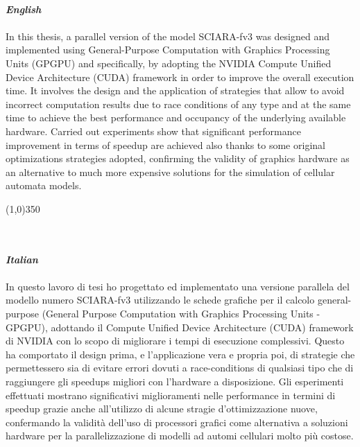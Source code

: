 \hfill \\
\textit{\textbf{English}}   \hfill \\
\hfill \\
 In
this thesis, a parallel version of the model SCIARA-fv3\cite{Spataro2010} was
designed and implemented using General-Purpose Computation with Graphics
Processing Units (GPGPU) and specifically, by adopting the NVIDIA Compute
Unified Device Architecture (CUDA)\cite{NvidiaprogGuide} framework in order to
improve the overall execution time. It involves the design and the application
of strategies that allow to avoid incorrect computation results due to race
conditions of any type and at the same time to achieve the best performance and
occupancy of the underlying available hardware. Carried out experiments show
that significant performance improvement in terms of speedup are achieved also
thanks to some original optimizations strategies adopted, confirming the
validity of graphics hardware as an alternative to much more expensive solutions
for the simulation of cellular automata models.
\hfill \\
\begin{center}
\line(1,0){350} \hfill \\
\end{center}
\hfill \\
\hfill \\
\textit{\textbf{Italian}}   \hfill \\
\hfill \\


In questo lavoro di tesi ho progettato ed implementato una versione parallela
del modello numero SCIARA-fv3\cite{Spataro2010} utilizzando le schede grafiche
per il calcolo general-purpose (General Purpose Computation with Graphics
Processing Units - GPGPU), adottando il  Compute Unified Device Architecture (CUDA)\cite{NvidiaprogGuide} framework
di NVIDIA con lo scopo di migliorare i tempi di esecuzione complessivi.
Questo ha comportato il design prima, e l'applicazione vera e propria poi, di
strategie che permettessero sia di evitare errori dovuti a race-conditions di
qualsiasi tipo che di raggiungere gli speedups migliori con l'hardware a
disposizione. Gli esperimenti effettuati mostrano significativi miglioramenti
nelle performance in termini di speedup grazie anche all'utilizzo di alcune stragie d'ottimizzazione nuove,
confermando la validit\`a dell'uso di processori grafici come alternativa a
soluzioni hardware per la parallelizzazione di modelli ad
automi cellulari molto pi\`u costose.



